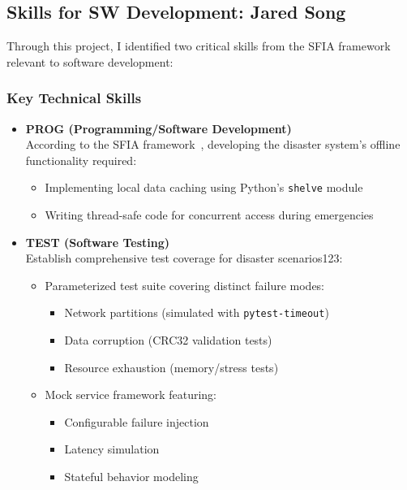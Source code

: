 \documentclass[a4paper, 11pt]{report}
\begin{document}
\newpage

\subsection{Skills for SW Development: Jared Song}
Through this project, I identified two critical skills from the SFIA framework relevant to software development:

\subsubsection{Key Technical Skills}
\begin{itemize}
    \item \textbf{PROG (Programming/Software Development)} \\
    According to the SFIA framework~\cite{sfia}, developing the disaster system's offline functionality required:
    \begin{itemize}
        \item Implementing local data caching using Python's \texttt{shelve} module
        \item Writing thread-safe code for concurrent access during emergencies
    \end{itemize}

    \item \textbf{TEST (Software Testing)} \\
    Establish comprehensive test coverage for disaster scenarios123:
    \begin{itemize}
        \item Parameterized test suite covering distinct failure modes:
        \begin{itemize}
            \item Network partitions (simulated with \texttt{pytest-timeout})
            \item Data corruption (CRC32 validation tests)
            \item Resource exhaustion (memory/stress tests)
        \end{itemize}

        \item Mock service framework featuring:
        \begin{itemize}
            \item Configurable failure injection 
            \item Latency simulation 
            \item Stateful behavior modeling
        \end{itemize}
    \end{itemize}
\end{itemize}
\end{document}
